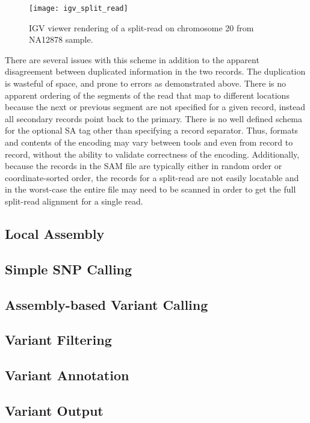 \begin{figure}[H]
    \texttt{[image: igv\_split\_read]}
    \centering
    \caption {IGV viewer rendering of a split-read on chromosome 20 from NA12878 sample.}
    \label{fig:igv_split_read}
\end{figure}

There are several issues with this scheme in addition to the apparent disagreement between duplicated information in the two records. The duplication is wasteful of space, and prone to errors as demonstrated above. There is no apparent ordering of the segments of the read that map to different locations because the next or previous segment are not specified for a given record, instead all secondary records point back to the primary. There is no well defined schema for the optional SA tag other than specifying a record separator. Thus, formats and contents of the encoding may vary between tools and even from record to record, without the ability to validate correctness of the encoding. Additionally, because the records in the SAM file are typically either in random order or coordinate-sorted order, the records for a split-read are not easily locatable and in the worst-case the entire file may need to be scanned in order to get the full split-read alignment for a single read.

\subsection{Local Assembly}

\subsection{Simple SNP Calling}

\subsection{Assembly-based Variant Calling}

\subsection{Variant Filtering}

\subsection{Variant Annotation}

\subsection{Variant Output}

